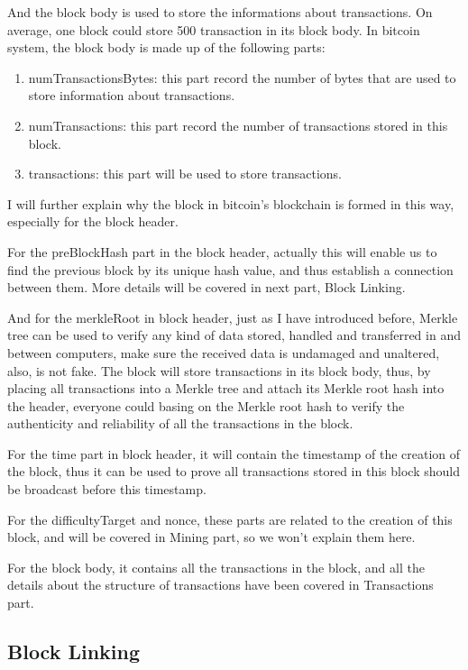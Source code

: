 \documentclass[12pt,a4paper]{article}
\begin{document}
And the block body is used to store the informations about transactions. On average, one block could store 500 transaction in its block body. In bitcoin system, the block body is made up of the following parts:

\begin{enumerate}
    \item 
    numTransactionsBytes: this part record the number of bytes that are used to store information about transactions.
    \item
    numTransactions: this part record the number of transactions stored in this block.
    \item
    transactions: this part will be used to store transactions.
\end{enumerate}

I will further explain why the block in bitcoin's blockchain is formed in this way, especially for the block header.

For the preBlockHash part in the block header, actually this will enable us to find the previous block by its unique hash value, and thus establish a connection between them. More details will be covered in next part, Block Linking.

And for the merkleRoot in block header, just as I have introduced before, Merkle tree can be used to verify any kind of data stored, handled and transferred in and between computers, make sure the received data is undamaged and unaltered, also, is not fake. The block will store transactions in its block body, thus, by placing all transactions into a Merkle tree and attach its Merkle root hash into the header, everyone could basing on the Merkle root hash to verify the authenticity and reliability of all the transactions in the block.

For the time part in block header, it will contain the timestamp of the creation of the block, thus it can be used to prove all transactions stored in this block should be broadcast before this timestamp.

For the difficultyTarget and nonce, these parts are related to the creation of this block, and will be covered in Mining part, so we won't explain them here.

For the block body, it contains all the transactions in the block, and all the details about the structure of transactions have been covered in Transactions part.

\subsection{Block Linking}
\end{document}
